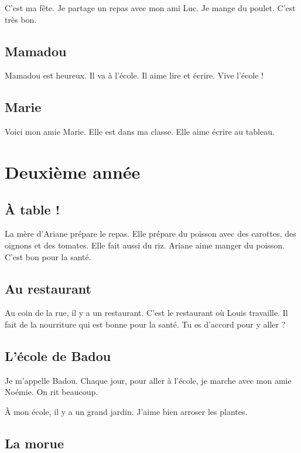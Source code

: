 \documentclass[11pt, french]{article}
\begin{document}
C'est ma fête. Je partage un repas avec mon ami Luc. Je mange du poulet. C'est très bon.

\subsection{Mamadou}

Mamadou est heureux. Il va à l'école. Il aime lire et écrire. Vive l'école !

\subsection{Marie}

Voici mon amie Marie. Elle est dans ma classe. Elle aime écrire au tableau.

\vfill



\section{Deuxième année}

\subsection{À table !}

La mère d'Ariane prépare le repas. Elle prépare du poisson avec des carottes, des oignons et des tomates. Elle fait aussi du riz. Ariane aime manger du poisson. C'est bon pour la santé.

\subsection{Au restaurant}

Au coin de la rue, il y a un restaurant. C'est le restaurant où Louis travaille. Il fait de la nourriture qui est bonne pour la santé. Tu es d'accord pour y aller ?

\subsection{L'école de Badou}

Je m'appelle Badou. Chaque jour, pour aller à l'école, je marche avec mon amie Noémie. On rit beaucoup.

À mon école, il y a un grand jardin. J'aime bien arroser les plantes.

\subsection{La morue}
\end{document}
